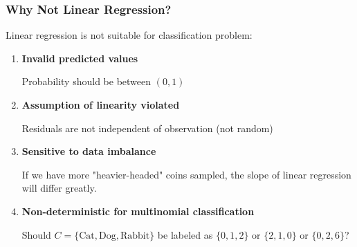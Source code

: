 \documentclass[10pt,aspectratio=169]{beamer}
\begin{document}
\begin{frame}
  \frametitle{Why Not Linear Regression?}
  Linear regression is not suitable for classification problem:

  \begin{enumerate}
  \item \textbf{Invalid predicted values}

    Probability should be between $(0, 1)$
  
  \item \textbf{Assumption of linearity violated}

    Residuals are not independent of observation (not random)

  
  \item \textbf{Sensitive to data imbalance}

    If we have more "heavier-headed" coins sampled, the slope of linear regression will differ greatly.

    
  \item \textbf{Non-deterministic for multinomial classification}

    Should $C = \{\mathrm{Cat}, \mathrm{Dog}, \mathrm{Rabbit}\}$ be labeled as $\{0, 1, 2\}$ or $\{2, 1, 0\}$ or $\{0, 2, 6\}$?
    
  \end{enumerate}
\end{frame}
\end{document}
